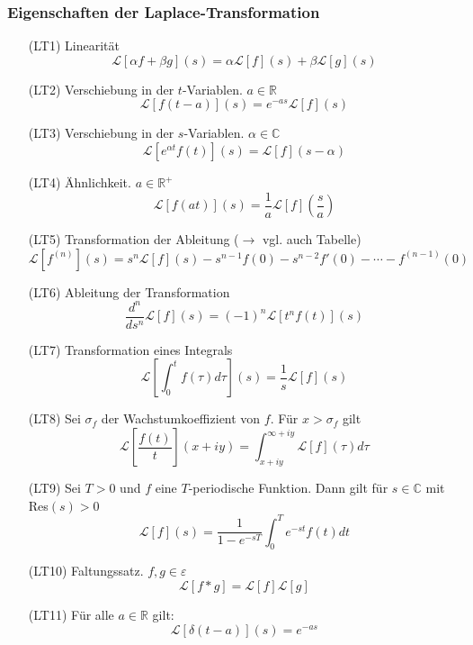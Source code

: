\documentclass[8pt, a4paper, landscape, fleqn]{scrartcl}
\def\R{\mathbb{R}}
\def\C{\mathbb{C}}
\begin{document}
\begin{multicols*}{3}
        \subsubsection{Eigenschaften der Laplace-Transformation}
        \begin{itemize}[leftmargin=1cm]
		    \item[(LT1)] Linearität 
		    $$ \mathcal{L}[\alpha f + \beta g](s) = \alpha \mathcal{L}[f](s) + \beta \mathcal{L}[g](s) $$
		    \item[(LT2)] Verschiebung in der $t$-Variablen. $a \in \R$ 
		    $$ \mathcal{L}[f(t-a)](s) = e^{-as}\mathcal{L}[f](s) $$
		    \item[(LT3)] Verschiebung in der $s$-Variablen. $\alpha \in \C$
		    $$ \mathcal{L}[e^{\alpha t}f(t)](s) = \mathcal{L}[f](s-\alpha) $$
		    \item[(LT4)] Ähnlichkeit. $a \in \R^+$
		    $$ \mathcal{L}[f(at)](s) = \frac{1}{a}\mathcal{L}[f]\left(\frac{s}{a}\right) $$
		    \item[(LT5)] Transformation der Ableitung ($\rightarrow$ vgl. auch Tabelle)
		    $$ \mathcal{L}\left[f^{(n)}\right](s) = s^n \mathcal{L}[f](s) - s^{n-1} f(0) - s^{n-2} f'(0) - \cdots - f^{(n-1)}(0)$$
		    \item[(LT6)] Ableitung der Transformation
		    $$\frac{d^n}{ds^n} \mathcal{L}[f](s) = (-1)^n \mathcal{L}[t^n f(t)](s) $$
		    \item[(LT7)] Transformation eines Integrals
		    $$ \mathcal{L} \left[ \int_0^t f(\tau) d\tau \right] (s) = \frac{1}{s}\mathcal{L}[f](s) $$
		    \item[(LT8)] Sei $\sigma_f$ der Wachstumkoeffizient von $f$. Für $x>\sigma_f$ gilt
		    $$ \mathcal{L}\left[ \frac{f(t)}{t}\right] (x+iy) = \int_{x+iy}^{\infty + iy} \mathcal{L}[f](\tau) d\tau $$
		    \item[(LT9)] Sei $T>0$ und $f$ eine $T$-periodische Funktion. Dann gilt für $s \in \C$ mit Res$(s) > 0$
		    $$ \mathcal{L}[f](s) = \frac{1}{1-e^{-sT}} \int_0^T e^{-st} f(t) dt $$
            \item[(LT10)] Faltungssatz. $f,g \in \varepsilon$
            $$\mathcal{L}[f*g] = \mathcal{L}[f]\mathcal{L}[g]$$
            \item[(LT11)] Für alle $a\in\R$ gilt: $$ \mathcal{L}[\delta(t-a)](s) = e^{-as}$$
	    \end{itemize}
		

\end{multicols*}
\end{document}

